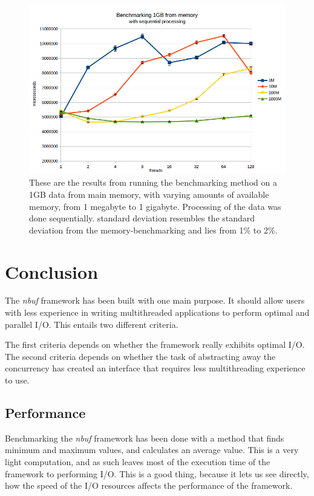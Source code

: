 \documentclass[a4paper]{article}
\newcommand{\nbuf}{\textit{nbuf} }
\begin{document}
\begin{figure}
	\begin{adjustwidth}{-0.5in}{-0.5in}
    \centering
     \includegraphics[scale=0.7]{../test_results/mem_seq.png}
  	\caption{These are the results from running the benchmarking method on a 1GB data from main memory, with varying amounts of available memory, from 1 megabyte to 1 gigabyte. Processing of the data was done sequentially. standard deviation resembles the standard deviation from the memory-benchmarking and lies from 1\% to 2\%.}
	\label{figure:mem-seq}
	\end{adjustwidth}
\end{figure}


\newpage
\section{Conclusion}
The \nbuf framework has been built with one main purpose. It should allow users with less experience in writing multithreaded applications to perform optimal and parallel I/O. This entails two different criteria. 

The first criteria depends on whether the framework really exhibits optimal I/O. The second criteria depends on whether the task of abstracting away the concurrency has created an interface that requires less multithreading experience to use.


\subsection{Performance}
Benchmarking the \nbuf framework has been done with a method that finds minimum and maximum values, and calculates an average value. This is a very light computation, and as such leaves most of the execution time of the framework to performing I/O. This is a good thing, because it lets us see directly, how the speed of the I/O resources affects the performance of the framework.\\
\end{document}
